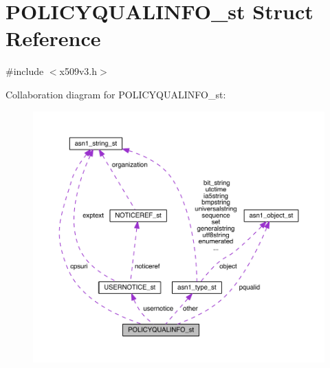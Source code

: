 \hypertarget{struct_p_o_l_i_c_y_q_u_a_l_i_n_f_o__st}{}\section{P\+O\+L\+I\+C\+Y\+Q\+U\+A\+L\+I\+N\+F\+O\+\_\+st Struct Reference}
\label{struct_p_o_l_i_c_y_q_u_a_l_i_n_f_o__st}


{\ttfamily \#include $<$x509v3.\+h$>$}



Collaboration diagram for P\+O\+L\+I\+C\+Y\+Q\+U\+A\+L\+I\+N\+F\+O\+\_\+st\+:\nopagebreak
\begin{figure}[H]
\begin{center}
\leavevmode
\includegraphics[width=350pt]{struct_p_o_l_i_c_y_q_u_a_l_i_n_f_o__st__coll__graph}
\end{center}
\end{figure}
